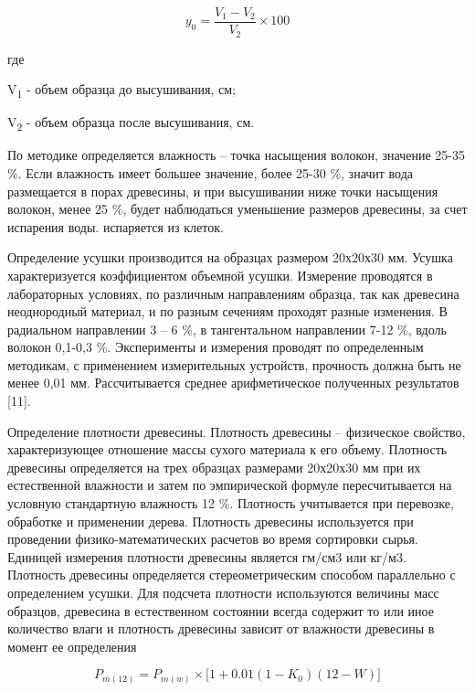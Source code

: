 \begin{equation}
y_{0} = \frac{V_{1} - V_{2}}{V_{2}} \times 100
\end{equation}

\begin{multicols}{2}
где

V\textsubscript{1} - объем образца до высушивания, см;

V\textsubscript{2} - объем образца после высушивания, см.

По методике определяется влажность -- точка насыщения волокон, значение
25-35 \%. Если влажность имеет большее значение, более 25-30 \%, значит
вода размещается в порах древесины, и при высушивании ниже точки
насыщения волокон, менее 25 \%, будет наблюдаться уменьшение размеров
древесины, за счет испарения воды. испаряется из клеток.

Определение усушки производится на образцах размером 20х20х30 мм. Усушка
характеризуется коэффициентом объемной усушки. Измерение проводятся в
лабораторных условиях, по различным направлениям образца, так как
древесина неоднородный материал, и по разным сечениям проходят разные
изменения. В радиальном направлении 3 -- 6 \%, в тангентальном
направлении 7-12 \%, вдоль волокон 0,1-0,3 \%. Эксперименты и измерения
проводят по определенным методикам, с применением измерительных
устройств, прочность должна быть не менее 0,01 мм. Рассчитывается
среднее арифметическое полученных результатов {[}11{]}.

Определение плотности древесины. Плотность древесины -- физическое
свойство, характеризующее отношение массы сухого материала к его объему.
Плотность древесины определяется на трех образцах размерами 20х20х30 мм
при их естественной влажности и затем по эмпирической формуле
пересчитывается на условную стандартную влажность 12 \%. Плотность
учитывается при перевозке, обработке и применении дерева. Плотность
древесины используется при проведении физико-математических расчетов во
время сортировки сырья. Единицей измерения плотности древесины является
гм/см3 или кг/м3. Плотность древесины определяется стереометрическим
способом параллельно с определением усушки. Для подсчета плотности
используются величины масс образцов, древесина в естественном состоянии
всегда содержит то или иное количество влаги и плотность древесины
зависит от влажности древесины в момент ее определения
\end{multicols}

\begin{equation}
P_{m(12)} = P_{m(w)} \times \text{[}1 + 0.01(1 - K_{0})(12 - W)\rbrack
\end{equation}

